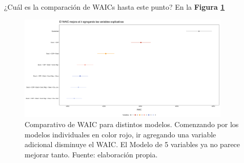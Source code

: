 ¿Cuál es la comparación de WAICs hasta este punto? En la \textbf{Figura \ref{fig:Compara_WAIC_Compuestos}}

\begin{figure}[h]
	\centering
	\includegraphics[width = 0.9\textwidth]{Figs/Modelado/Graf_WAIC_Modelos_Compuestos}
	\caption{Comparativo de WAIC para distintos modelos. Comenzando por los modelos individuales en color rojo, ir agregando una variable adicional disminuye el WAIC. El Modelo de 5 variables ya no parece mejorar tanto. Fuente: elaboración propia.}
	\label{fig:Compara_WAIC_Compuestos}
\end{figure}